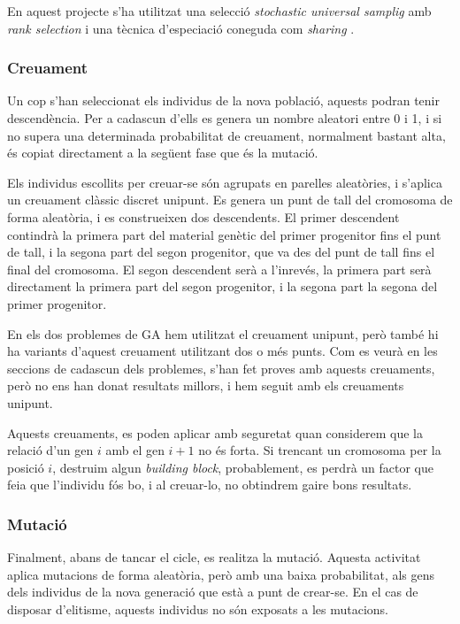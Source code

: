 En aquest projecte s'ha utilitzat una selecció \emph{stochastic
universal samplig} \cite{B87a} amb \emph{rank selection} \cite{B87b} i una
tècnica d'especiació coneguda com \emph{sharing} \cite{33}.

\subsubsection{Creuament}

Un cop s'han seleccionat els individus de la nova població, aquests podran tenir
descendència. Per a cadascun d'ells es genera un nombre aleatori entre 0 i 1, i
si no supera una determinada probabilitat de creuament, normalment bastant alta,
és copiat directament a la següent fase que és la mutació.

Els individus escollits per creuar-se són agrupats en parelles aleatòries, i
s'aplica un creuament clàssic discret unipunt.  Es genera un punt de tall del
cromosoma de forma aleatòria, i es construeixen dos descendents. El primer
descendent contindrà la primera part del material genètic del primer progenitor
fins el punt de tall, i la segona part del segon progenitor, que va des del punt
de tall fins el final del cromosoma. El segon descendent serà a l'inrevés, la
primera part serà directament la primera part del segon progenitor, i la segona
part la segona del primer progenitor.

En els dos problemes de GA hem utilitzat el creuament unipunt, però també hi
ha variants d'aquest creuament utilitzant dos o més punts.  Com es veurà en les
seccions de cadascun dels problemes, s'han fet proves amb aquests creuaments,
però no ens han donat resultats millors, i hem seguit amb els creuaments
unipunt.

Aquests creuaments, es poden aplicar amb seguretat quan considerem que la
relació d'un gen $i$ amb el gen $i+1$ no és forta.  Si trencant un cromosoma per
la posició $i$, destruim algun \emph{building block}, probablement, es perdrà un
factor que feia que l'individu fós bo, i al creuar-lo, no obtindrem gaire bons
resultats.

\subsubsection{Mutació}

Finalment, abans de tancar el cicle, es realitza la mutació. Aquesta activitat
aplica mutacions de forma aleatòria, però amb una baixa probabilitat, als gens
dels individus de la nova generació que està a punt de crear-se. En el cas de
disposar d'elitisme, aquests individus no són exposats a les mutacions.

